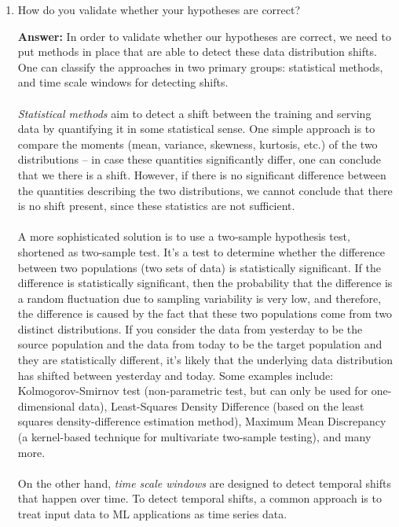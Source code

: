 \documentclass{article}
\newenvironment{QandA}{\begin{enumerate}[label=\arabic*.]}{\end{enumerate}}
\newenvironment{InnerQandA}{\begin{enumerate}[label=\roman*.]}{\end{enumerate}}
\newenvironment{ListAlph}{\begin{enumerate}[label=(\alph*)]}{\end{enumerate}}
\newenvironment{answer}{\par\normalfont \textbf{Answer:}}{}
\begin{document}
\begin{QandA}
\begin{InnerQandA}
\begin{answer}
\begin{ListAlph}
            \end{ListAlph}
        \end{answer}

        \item How do you validate whether your hypotheses are correct?
        \begin{answer}
            In order to validate whether our hypotheses are correct, we need to put methods in place that are able to detect these data distribution shifts. One can classify the approaches in two primary groups: statistical methods, and time scale windows for detecting shifts.\\\\
            \textit{Statistical methods} aim to detect a shift between the training and serving data by quantifying it in some statistical sense. One simple approach is to compare the moments (mean, variance, skewness, kurtosis, etc.) of the two distributions -- in case these quantities significantly differ, one can conclude that we there is a shift. However, if there is no significant difference between the quantities describing the two distributions, we cannot conclude that there is no shift present, since these statistics are not sufficient. \\\\
            A more sophisticated solution is to use a two-sample hypothesis test, shortened as two-sample test. It’s a test to determine whether the difference between two populations (two sets of data) is statistically significant. If the difference is statistically significant, then the probability that the difference is a random fluctuation due to sampling variability is very low, and therefore, the difference is caused by the fact that these two populations come from two distinct distributions. If you consider the data from yesterday to be the source population and the data from today to be the target population and they are statistically different, it’s likely that the underlying data distribution has shifted between yesterday and today. Some examples include: Kolmogorov-Smirnov test (non-parametric test, but can only be used for one-dimensional data), Least-Squares Density Difference (based on the least squares density-difference estimation method), Maximum Mean Discrepancy (a kernel-based technique for multivariate two-sample testing), and many more. \\\\
            On the other hand, \textit{time scale windows} are designed to detect temporal shifts that happen over time. To detect temporal shifts, a common approach is to treat input data to ML applications as time series data. \\\\

\end{answer}
\end{InnerQandA}
\end{QandA}
\end{document}
